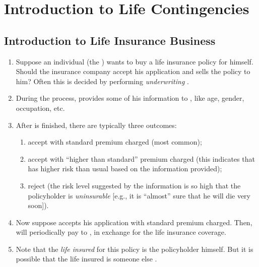 \section{Introduction to Life Contingencies}
\subsection{Introduction to Life Insurance Business}
\begin{enumerate}
\item Suppose an individual  (the ) wants to buy
a life insurance policy for himself.  Should the insurance company
 accept his application and sells the policy 
to him? Often this is decided by performing \emph{underwriting} .

\item During the   process,  provides some of his
information to , like age, gender, occupation, etc.

\item After  is finished, there are typically three outcomes:
\begin{enumerate}

\item accept with standard premium charged (most common);

\item accept with ``higher than standard'' premium charged (this indicates that
 has higher risk than usual based on the information provided);

\item reject (the risk level suggested by the information is so high that the
policyholder is \emph{uninsurable} [e.g., it is ``almost'' sure that he will
die very soon]).
\end{enumerate}

\item \label{it:charge-premiums} Now suppose  accepts his
application with standard premium charged. Then,  will
periodically pay   to , in
exchange for the life insurance coverage.

\item Note that the \emph{life insured} for this policy is the policyholder
 himself. But it is possible that the life insured is someone else
.


\end{enumerate}

